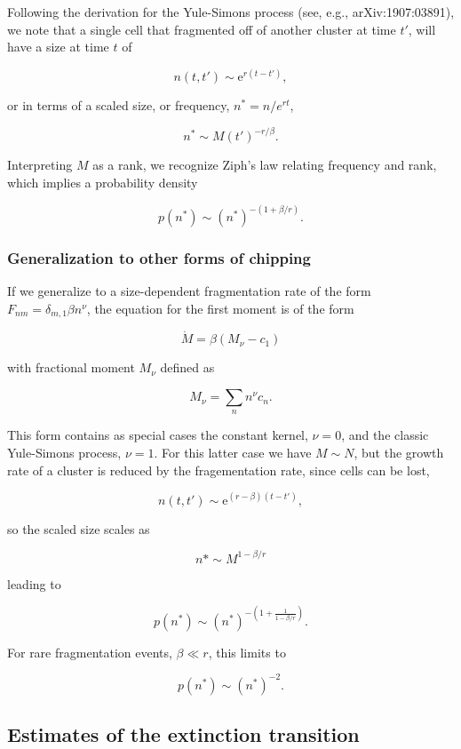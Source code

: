\documentclass[12pt]{article}
\def\be{\begin{equation}}
\def\ee{\end{equation}}
\def\e{\text{e}}
\begin{document}
Following the derivation for the Yule-Simons process (see, e.g., arXiv:1907:03891), we note that a single cell that fragmented off of another cluster at time $t'$, will have a size at time $t$ of

\be
n(t,t') \sim \e^{r(t-t')}, 
\ee

or in terms of a scaled size, or frequency, $n^* = n/e^{rt}$,

\be
n^* \sim M(t')^{-r/\beta}.
\ee

Interpreting $M$ as a rank, we recognize Ziph's law relating frequency and rank, which implies a probability density

\be
p(n^*) \sim (n^*)^{-(1 + \beta/r)}.
\ee

\subsubsection*{Generalization to other forms of chipping}
If we generalize to a size-dependent fragmentation rate of the form $F_{nm} = \delta_{m,1}\beta n^{\nu}$, the equation for the first moment is of the form

\be
\dot{M} = \beta(M_{\nu} - c_1)
\ee

with fractional moment $M_{\nu}$ defined as

\be
M_{\nu} = \sum_n n^{\nu}c_n.
\ee

This form contains as special cases the constant kernel, $\nu= 0$, and the classic Yule-Simons process, $\nu=1$. For this latter case we have $M \sim N$, but the growth rate of a cluster is reduced by the fragementation rate, since cells can be lost,

\be
n(t,t') \sim \e^{(r-\beta)(t-t')},
\ee

so the scaled size scales as

\be
n* \sim M^{1-\beta/r}
\ee

leading to

\be
p(n^*) \sim (n^*)^{-\left(1+\frac{1}{1-\beta/r}\right)}.
\ee

For rare fragmentation events, $\beta \ll r$, this limits to

\be
p(n^*) \sim (n^*)^{-2}.
\ee
\subsection*{Estimates of the extinction transition}

\end{document}
